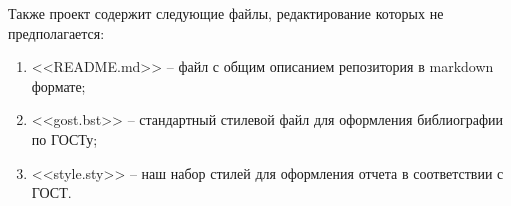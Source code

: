 Также проект содержит следующие файлы, редактирование которых не предполагается:
\begin{enumerate}
  \item <<README.md>> --
    файл с общим описанием репозитория в markdown формате;
  \item <<gost.bst>> --
    стандартный стилевой файл для оформления библиографии по ГОСТу;
  \item <<style.sty>> --
    наш набор стилей для оформления отчета в соответствии с ГОСТ.
\end{enumerate}
